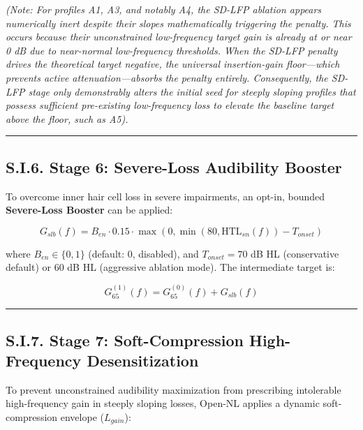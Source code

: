 \documentclass[
  12pt,
]{article}
\begin{document}
\emph{(Note: For profiles A1, A3, and notably A4, the SD-LFP ablation
appears numerically inert despite their slopes mathematically triggering
the penalty. This occurs because their unconstrained low-frequency
target gain is already at or near 0 dB due to near-normal low-frequency
thresholds. When the SD-LFP penalty drives the theoretical target
negative, the universal insertion-gain floor---which prevents active
attenuation---absorbs the penalty entirely. Consequently, the SD-LFP
stage only demonstrably alters the initial seed for steeply sloping
profiles that possess sufficient pre-existing low-frequency loss to
elevate the baseline target above the floor, such as A5).}

\begin{center}\rule{0.5\linewidth}{0.5pt}\end{center}

\subsection{S.I.6. Stage 6: Severe-Loss Audibility
Booster}\label{s.i.6.-stage-6-severe-loss-audibility-booster}

To overcome inner hair cell loss in severe impairments, an opt-in,
bounded \textbf{Severe-Loss Booster} can be applied:

\begin{equation}
G_{slb}(f) = B_{en} \cdot 0.15 \cdot \max\left(0, \min(80, \text{HTL}_{sn}(f)) - T_{onset}\right)
\end{equation}

where \(B_{en} \in \{0, 1\}\) (default: 0, disabled), and
\(T_{onset} = 70\) dB HL (conservative default) or \(60\) dB HL
(aggressive ablation mode). The intermediate target is:

\begin{equation}
G_{65}^{(1)}(f) = G_{65}^{(0)}(f) + G_{slb}(f)
\end{equation}

\begin{center}\rule{0.5\linewidth}{0.5pt}\end{center}

\subsection{S.I.7. Stage 7: Soft-Compression High-Frequency
Desensitization}\label{s.i.7.-stage-7-soft-compression-high-frequency-desensitization}

To prevent unconstrained audibility maximization from prescribing
intolerable high-frequency gain in steeply sloping losses, Open-NL
applies a dynamic soft-compression envelope (\(L_{gain}\)):
\end{document}

